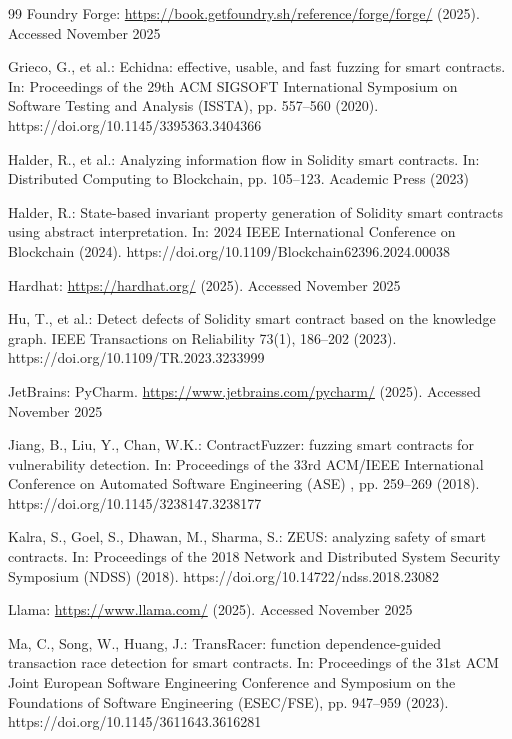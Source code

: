 \documentclass[pdflatex,sn-basic]{sn-jnl}%
\theoremstyle{thmstyleone}%
\theoremstyle{thmstyletwo}%
\theoremstyle{thmstylethree}%
\begin{document}
\begin{thebibliography}{99}
Foundry Forge: \url{https://book.getfoundry.sh/reference/forge/forge/} (2025). Accessed November
2025

Grieco, G., et al.: Echidna: effective, usable, and fast fuzzing for smart contracts. In:
Proceedings of the 29th ACM SIGSOFT International Symposium on Software Testing and Analysis (ISSTA),
pp. 557--560 (2020). https://doi.org/10.1145/3395363.3404366

Halder, R., et al.: Analyzing information flow in Solidity smart contracts. In: Distributed
Computing to Blockchain, pp. 105--123. Academic Press (2023)

Halder, R.: State-based invariant property generation of Solidity smart contracts using abstract
interpretation. In: 2024 IEEE International Conference on Blockchain (2024). https://doi.org/10.1109/Blockchain62396.2024.00038

Hardhat: \url{https://hardhat.org/} (2025). Accessed November 2025

Hu, T., et al.: Detect defects of Solidity smart contract based on the knowledge graph. IEEE
Transactions on Reliability 73(1), 186--202 (2023). https://doi.org/10.1109/TR.2023.3233999

JetBrains: PyCharm. \url{https://www.jetbrains.com/pycharm/} (2025). Accessed November 2025

Jiang, B., Liu, Y., Chan, W.K.: ContractFuzzer: fuzzing smart contracts for vulnerability detection.
In: Proceedings of the 33rd ACM/IEEE International Conference on Automated Software Engineering (ASE)
, pp. 259--269 (2018). https://doi.org/10.1145/3238147.3238177

Kalra, S., Goel, S., Dhawan, M., Sharma, S.: ZEUS: analyzing safety of smart contracts. In:
Proceedings of the 2018 Network and Distributed System Security Symposium (NDSS) (2018). https://doi.org/10.14722/ndss.2018.23082

Llama: \url{https://www.llama.com/} (2025). Accessed November 2025

Ma, C., Song, W., Huang, J.: TransRacer: function dependence-guided transaction race detection for
smart contracts. In: Proceedings of the 31st ACM Joint European Software Engineering Conference and
Symposium on the Foundations of Software Engineering (ESEC/FSE), pp. 947--959 (2023). https://doi.org/10.1145/3611643.3616281


\end{thebibliography}
\end{document}
